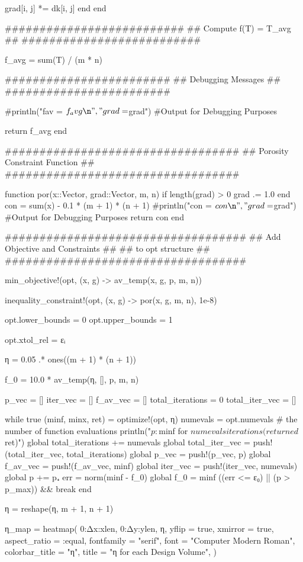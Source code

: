 \begin{jllisting}
			grad[i, j] *= dk[i, j]
		end
	end

	##########################
	## Compute f(T) = T_avg ##
	##########################
	
	f_avg = sum(T) / (m * n)
	
	########################
	## Debugging Messages ##
	########################
	
	#println("fav = $f_avg\n", "grad = $grad\n") #Output for Debugging Purposes
	
	return f_avg
end

##################################
## Porosity Constraint Function ##
##################################

function por(x::Vector, grad::Vector, m, n)
	if length(grad) > 0
		grad .= 1.0
	end
	con = sum(x) - 0.1 * (m + 1) * (n + 1)
	#println("con = $con\n", "grad = $grad\n") #Output for Debugging Purposes
	return con
end

###################################
## Add Objective and Constraints ## 
##       to opt structure        ##
###################################

min_objective!(opt, (x, g) -> av_temp(x, g, p, m, n))

inequality_constraint!(opt, (x, g) -> por(x, g, m, n), 1e-8)

opt.lower_bounds = 0
opt.upper_bounds = 1

opt.xtol_rel = εᵢ

η = 0.05 .* ones((m + 1) * (n + 1))

f_0 = 10.0 * av_temp(η, [], p, m, n)

p_vec = []
iter_vec = []
f_av_vec = []
total_iterations = 0
total_iter_vec = []

while true
	(minf, minx, ret) = optimize!(opt, η)
	numevals = opt.numevals # the number of function evaluations
	println("$p: $minf for $numevals iterations (returned $ret)")
	global total_iterations += numevals
	global total_iter_vec = push!(total_iter_vec, total_iterations)
	global p_vec = push!(p_vec, p)
	global f_av_vec = push!(f_av_vec, minf)
	global iter_vec = push!(iter_vec, numevals)
	global p += p₊
	err = norm(minf - f_0)
	global f_0 = minf
	((err <= ε₀) || (p > p_max)) && break
end

η = reshape(η, m + 1, n + 1)

η_map = heatmap(
	0:Δx:xlen,
	0:Δy:ylen,
	η,
	yflip = true,
	xmirror = true,
	aspect_ratio = :equal,
	fontfamily = "serif",
	font = "Computer Modern Roman",
	colorbar_title = "η",
	title = "η for each Design Volume",
)
\end{jllisting}